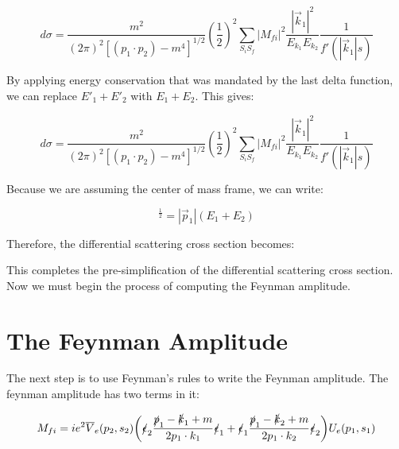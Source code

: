 \documentclass[a4]{article}
\begin{document}
    \begin{equation}
        d \sigma = \frac{m^2}{(2 \pi)^2 [(p_1 \cdot p_2) - m^4]^{1/2}} (\frac{1}{2})^2 \sum_{S_i S_f} |M_{fi}|^2 \frac{|\vec{k}_1|^2}{E_{k_1} E_{k_2}} \frac{1}{f' (|\vec{k}_1|s)}
    \end{equation}

    By applying energy conservation that was mandated by the last delta function, we can replace $E'_1 + E'_2$ with $E_1 + E_2$. This gives:

    \begin{equation}
        d \sigma = \frac{m^2}{(2 \pi)^2 [(p_1 \cdot p_2) - m^4]^{1/2}} (\frac{1}{2})^2 \sum_{S_i S_f} |M_{fi}|^2 \frac{|\vec{k}_1|^2}{E_{k_1} E_{k_2}} \frac{1}{f' (|\vec{k}_1|s)}
    \end{equation}

    Because we are assuming the center of mass frame, we can write:

    \begin{equation}
        [(p_1 \cdot p_2)^2 - m_1^2 m_2^2]^\frac{1}{2} = |\vec{p}_1| (E_1 + E_2)
    \end{equation}

    Therefore, the differential scattering cross section becomes:

    \begin{center}
    \end{center}

    This completes the pre-simplification of the differential scattering cross section. Now we must begin the process of computing the Feynman amplitude.

    \section*{The Feynman Amplitude}

    The next step is to use Feynman's rules to write the Feynman amplitude. The feynman amplitude has two terms in it:

    \begin{equation}
        M_{fi} = i e^2 \overline{V}_e (p_2, s_2) \bigg( \slashed{\epsilon}_2 \frac{\slashed{p}_1 - \slashed{k}_1 + m}{2 p_1 \cdot k_1} \slashed{\epsilon}_1  + \slashed{\epsilon}_1 \frac{\slashed{p}_1 - \slashed{k}_2 + m}{2 p_1 \cdot k_2} \slashed{\epsilon}_2 \bigg) U_e (p_1, s_1)
    \end{equation}
\end{document}
